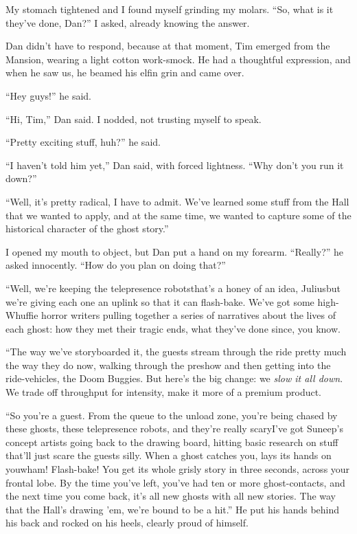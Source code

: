My stomach tightened and I found myself grinding my molars. “So,
what is it they've done, Dan?” I asked, already knowing the
answer.

Dan didn't have to respond, because at that moment, Tim emerged
from the Mansion, wearing a light cotton work-smock. He had a
thoughtful expression, and when he saw us, he beamed his elfin grin
and came over.

“Hey guys!” he said.

“Hi, Tim,” Dan said. I nodded, not trusting myself to speak.

“Pretty exciting stuff, huh?” he said.

“I haven't told him yet,” Dan said, with forced lightness. “Why
don't you run it down?”

“Well, it's pretty radical, I have to admit. We've learned some
stuff from the Hall that we wanted to apply, and at the same time,
we wanted to capture some of the historical character of the ghost
story.”

I opened my mouth to object, but Dan put a hand on my forearm.
“Really?” he asked innocently. “How do you plan on doing that?”

“Well, we're keeping the telepresence robots{\dash}that's a honey of an
idea, Julius{\dash}but we're giving each one an uplink so that it can
flash-bake. We've got some high-Whuffie horror writers pulling
together a series of narratives about the lives of each ghost: how
they met their tragic ends, what they've done since, you know.

“The way we've storyboarded it, the guests stream through the ride
pretty much the way they do now, walking through the preshow and
then getting into the ride-vehicles, the Doom Buggies. But here's
the big change: we \emph{slow it all down}. We trade off throughput
for intensity, make it more of a premium product.

“So you're a guest. From the queue to the unload zone, you're being
chased by these ghosts, these telepresence robots, and they're
really scary{\dash}I've got Suneep's concept artists going back to the
drawing board, hitting basic research on stuff that'll just scare
the guests silly. When a ghost catches you, lays its hands on
you{\dash}wham! Flash-bake! You get its whole grisly story in three
seconds, across your frontal lobe. By the time you've left, you've
had ten or more ghost-contacts, and the next time you come back,
it's all new ghosts with all new stories. The way that the Hall's
drawing 'em, we're bound to be a hit.” He put his hands behind his
back and rocked on his heels, clearly proud of himself.

